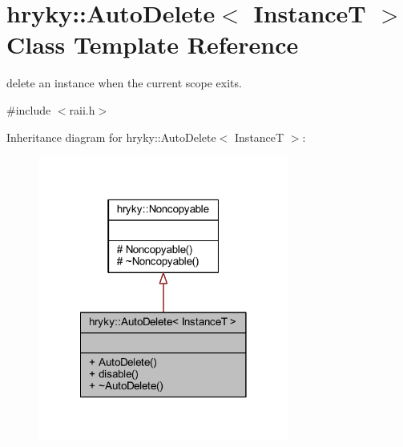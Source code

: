 \hypertarget{classhryky_1_1_auto_delete}{\section{hryky\-:\-:Auto\-Delete$<$ Instance\-T $>$ Class Template Reference}
\label{classhryky_1_1_auto_delete}
}


delete an instance when the current scope exits.  




{\ttfamily \#include $<$raii.\-h$>$}



Inheritance diagram for hryky\-:\-:Auto\-Delete$<$ Instance\-T $>$\-:
\nopagebreak
\begin{figure}[H]
\begin{center}
\leavevmode
\includegraphics[width=234pt]{classhryky_1_1_auto_delete__inherit__graph}
\end{center}
\end{figure}

